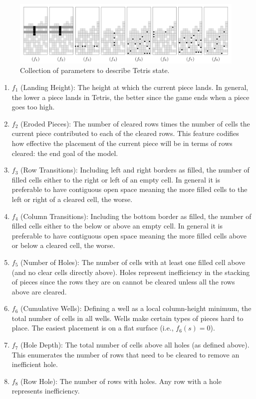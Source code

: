 \documentclass[12pt,letterpaper]{article}
\begin{document}
\begin{figure}[h!]
  \centering
  \includegraphics[width=0.8\linewidth]{features.png}
  \caption{Collection of parameters to describe Tetris state.}
\end{figure}

\begin{enumerate}
  \item $f_1$ (Landing Height): The height at which the current piece lands. In general, the lower a piece lands in Tetris, the better since the game ends when a piece goes too high.
  \item $f_2$ (Eroded Pieces): The number of cleared rows times the number of cells the current piece contributed to each of the cleared rows. This feature codifies how effective the placement of the current piece will be in terms of rows cleared: the end goal of the model.
  \item $f_3$ (Row Transitions): Including left and right borders as filled, the number of filled cells either to the right or left of an empty cell. In general it is preferable to have contiguous open space meaning the more filled cells to the left or right of a cleared cell, the worse.
  \item $f_4$ (Column Transitions): Including the bottom border as filled, the number of filled cells either to the below or above an empty cell. In general it is preferable to have contiguous open space meaning the more filled cells above or below a cleared cell, the worse.
  \item $f_5$ (Number of Holes): The number of cells with at least one filled cell above (and no clear cells directly above). Holes represent inefficiency in the stacking of pieces since the rows they are on cannot be cleared unless all the rows above are cleared.
  \item $f_6$ (Cumulative Wells): Defining a well as a local column-height minimum, the total number of cells in all wells. Wells make certain types of pieces hard to place. The easiest placement is on a flat surface (i.e., $f_6(s) = 0$).
  \item $f_7$ (Hole Depth): The total number of cells above all holes (as defined above). This enumerates the number of rows that need to be cleared to remove an inefficient hole.
  \item $f_8$ (Row Hole): The number of rows with holes. Any row with a hole represents inefficiency.
\end{enumerate}
\end{document}
